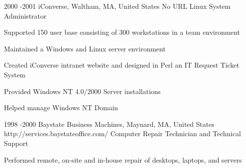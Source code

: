 \documentclass[10pt]{article} %
\begin{document}
\job
{2000 -}{2001}
{iConverse, Waltham, MA, United States}
{No URL}
{Linux System Administrator}
{\begin{itemize-noindent}
\item{Supported 150 user base consisting of 300 workstations in a team environment}
\item{Maintained a Windows and Linux server environment}
\item{Created iConverse intranet website and designed in Perl an IT Request Ticket System}
\item{Provided Windows NT 4.0/2000 Server installations}
\item{Helped manage Windows NT Domain}
\end{itemize-noindent}}

\job
{1998 -}{2000}
{Baystate Business Machines, Maynard, MA, United States}
{http://services.baystateoffice.com/}
{Computer Repair Technician and Technical Support}
{\begin{itemize-noindent}
\item{Performed remote, on-site and in-house repair of desktops, laptops, and servers}
\end{itemize-noindent}}
\end{document}
